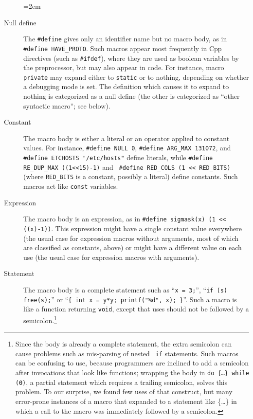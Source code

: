 \begin{description}
  \sloppy
  \emergencystretch=2em

\item[Null define]  The {\tt \#define} gives only an
  identifier name but no macro body, as in {\tt \#define
  \verb|HAVE_PROTO|}\@.  Such macros appear most frequently in Cpp
directives (such as {\tt \#ifdef}), where they are used as boolean
variables by the preprocessor, but may also appear in code.  For instance,
macro {\tt private} may expand either to {\tt static} or to nothing,
depending on whether a debugging mode is set.  The definition which
causes it to expand to nothing is categorized as a null define (the
other is categorized as ``other syntactic macro'';  see below).

\item[Constant] The macro body is either a literal or an operator
  applied to constant values.  For instance, {\tt \#define NULL 0}, {\tt \#define
  \verb|ARG_MAX| 131072}, and {\tt \#define ETCHOSTS "/etc/hosts"} define
literals, while {\tt \#define \verb|RE_DUP_MAX| ((1<<15)-1)} and {\tt
\#define \verb|RED_COLS| (1 << \verb|RED_BITS|)} (where \verb|RED_BITS| is
a constant, possibly a literal) define constants.  Such macros act like
{\tt const} variables.

\item[Expression]  The macro body is an expression, as in {\tt \#define
  sigmask(x) (1 << ((x)-1))}.  This expression might have a single constant
value everywhere (the usual case for expression macros without arguments,
most of which are classified as constants, above) or might have a
different value on each use (the usual case for expression macros with
arguments).

\item[Statement]  The macro body is a complete statement such as
  ``{\tt x = 3;}'', ``{\tt if (s) free(s);}'' or ``{\tt \verb|{| int x =
    y*y; printf("\%d", x); \verb|}|}''.  Such a macro is like a function
    returning {\tt void}, except that uses should not be followed by a
    semicolon.\footnote{Since the body is already a complete statement, the
      extra semicolon can cause problems such as mis-parsing of nested {\tt
      if} statements.  Such macros can be confusing to use, because
    programmers are inclined to add a semicolon after invocations that look
    like functions; wrapping the body in {\tt do \{\ldots\} while (0)}, a
    partial statement which requires a trailing semicolon, solves this
    problem.  To our surprise, we found few uses of that construct, but
    many error-prone instances of a macro that expanded to a statement like
    \{\ldots\} in which a call to the macro was immediately followed by a
    semicolon.}


\end{description}
